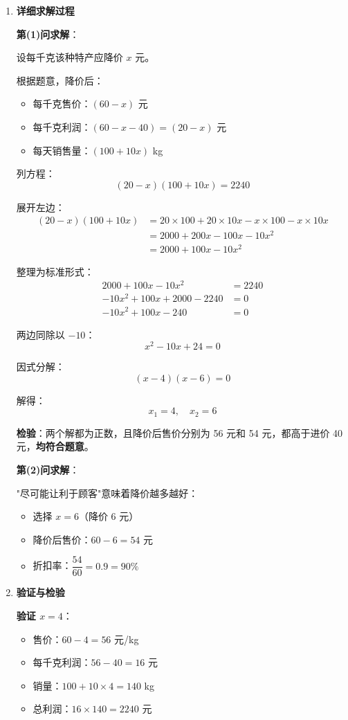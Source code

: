 \documentclass[UTF8]{ctexart}
\newenvironment{redenv}{\color{red}}{}
\newenvironment{detailedanalysis}{%
    \color{red}
    \begin{enumerate}[label=\textbf{第\arabic*步：}, leftmargin=*, align=left, itemsep=1.5ex]
}{%
    \end{enumerate}
}
\begin{document}
\begin{redenv}
\begin{detailedanalysis}
"尽可能让利于顾客"意味着要降价\textbf{最多}，即选择较大的降价金额，然后计算折扣。

\item \textbf{详细求解过程}

\noindent\textbf{第(1)问求解}：

设每千克该种特产应降价 $x$ 元。

根据题意，降价后：
\begin{itemize}
    \item 每千克售价：$(60 - x)$ 元
    \item 每千克利润：$(60 - x - 40) = (20 - x)$ 元
    \item 每天销售量：$(100 + 10x)$ kg
\end{itemize}

列方程：
\[
(20 - x)(100 + 10x) = 2240
\]

展开左边：
\begin{align*}
(20 - x)(100 + 10x) &= 20 \times 100 + 20 \times 10x - x \times 100 - x \times 10x \\
&= 2000 + 200x - 100x - 10x^2 \\
&= 2000 + 100x - 10x^2
\end{align*}

整理为标准形式：
\begin{align*}
2000 + 100x - 10x^2 &= 2240 \\
-10x^2 + 100x + 2000 - 2240 &= 0 \\
-10x^2 + 100x - 240 &= 0
\end{align*}

两边同除以 $-10$：
\[
x^2 - 10x + 24 = 0
\]

因式分解：
\[
(x - 4)(x - 6) = 0
\]

解得：
\[
x_1 = 4, \quad x_2 = 6
\]

\textbf{检验}：两个解都为正数，且降价后售价分别为 56 元和 54 元，都高于进价 40 元，\textbf{均符合题意}。

\noindent\textbf{第(2)问求解}：

"尽可能让利于顾客"意味着降价越多越好：
\begin{itemize}
    \item 选择 $x = 6$（降价 6 元）
    \item 降价后售价：$60 - 6 = 54$ 元
    \item 折扣率：$\dfrac{54}{60} = 0.9 = 90\%$
\end{itemize}

\item \textbf{验证与检验}

\noindent\textbf{验证 $x = 4$}：
\begin{itemize}
    \item 售价：$60 - 4 = 56$ 元/kg
    \item 每千克利润：$56 - 40 = 16$ 元
    \item 销量：$100 + 10 \times 4 = 140$ kg
    \item 总利润：$16 \times 140 = 2240$ 元 \checkmark
\end{itemize}


\end{detailedanalysis}
\end{redenv}
\end{document}
